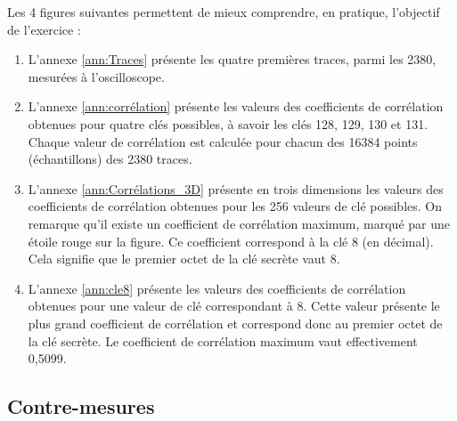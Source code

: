 \documentclass[oneside]{book}
\begin{document}
\hspace{-0.5 cm}Les 4 figures suivantes permettent de mieux comprendre, en pratique, l'objectif de l'exercice :
\begin{enumerate}
\item L'annexe \ref{ann:Traces} présente les quatre premières traces, parmi les 2380, mesurées à l'oscilloscope.
\item L'annexe \ref{ann:corrélation} présente les valeurs des coefficients de corrélation obtenues pour quatre clés possibles, à savoir les clés 128, 129, 130 et 131. Chaque valeur de corrélation est calculée pour chacun des 16384 points (échantillons) des 2380 traces. 
\item L'annexe \ref{ann:Corrélations_3D} présente en trois dimensions les valeurs des coefficients de corrélation obtenues pour les 256 valeurs de clé possibles. On remarque qu'il existe un coefficient de corrélation maximum, marqué par une étoile rouge sur la figure. Ce coefficient correspond à la clé 8 (en décimal). Cela signifie que le premier octet de la clé secrète vaut 8. 
\item L'annexe \ref{ann:cle8} présente les valeurs des coefficients de corrélation obtenues pour une valeur de clé correspondant à 8. Cette valeur présente le plus grand coefficient de corrélation et correspond donc au premier octet de la clé secrète. Le coefficient de corrélation maximum vaut effectivement 0,5099.
\end{enumerate}



\newpage
\subsection{Contre-mesures}
\label{sec:contre-mesures}
\end{document}
